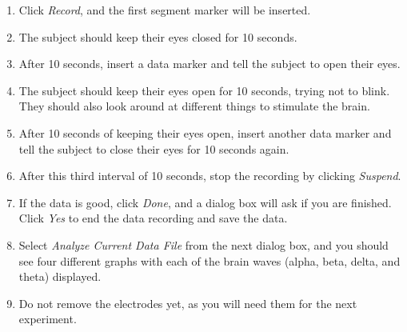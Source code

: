 \documentclass{article}
\begin{document}
\begin{enumerate}
	\item Click \textit{Record}, and the first segment marker will be inserted.
	\item The subject should keep their eyes closed for 10 seconds.
	\item After 10 seconds, insert a data marker and tell the subject to open their eyes.
	\item The subject should keep their eyes open for 10 seconds, trying not to blink. They should also look around at different things to stimulate the brain.
	\item After 10 seconds of keeping their eyes open, insert another data marker and tell the subject to close their eyes for 10 seconds again.
	\item After this third interval of 10 seconds, stop the recording by clicking \textit{Suspend}.	
	\item If the data is good, click \textit{Done}, and a dialog box will ask if you are finished. Click \textit{Yes} to end the data recording and save the data.
	\item Select \textit{Analyze Current Data File} from the next dialog box, and you should see four different graphs with each of the brain waves (alpha, beta, delta, and theta) displayed.
	\item Do not remove the electrodes yet, as you will need them for the next experiment.
\end{enumerate}
\end{document}
